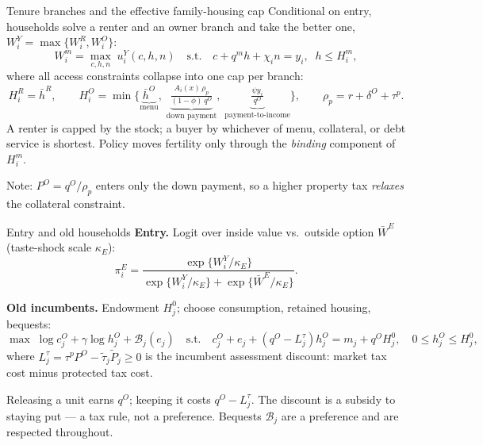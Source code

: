 \documentclass[11pt,aspectratio=169]{beamer}
\newcommand{\1}{\mathbf 1}
\begin{document}
\begin{frame}{Tenure branches and the effective family-housing cap}
\small
Conditional on entry, households solve a renter and an owner branch and take the better one, $W_i^Y=\max\{W_i^R,W_i^O\}$:
\[
W_i^m=\max_{c,h,n}\;u_i^Y(c,h,n)
\quad\text{s.t.}\quad
c+q^m h+\chi_i n=y_i,\;\; h\le H_i^m,
\]
where all access constraints collapse into one cap per branch:
\[
H_i^R=\bar h^R,
\qquad
H_i^O=\min\Big\{
\underbrace{\bar h^O}_{\text{menu}},\;
\underbrace{\tfrac{A_i(x)\,\rho_p}{(1-\phi)\,q^O}}_{\text{down payment}},\;
\underbrace{\tfrac{\psi y_i}{q^O}}_{\text{payment-to-income}}
\Big\},
\qquad
\rho_p=r+\delta^O+\tau^p .
\]
\smallskip
A renter is capped by the stock; a buyer by whichever of menu, collateral, or debt service is shortest. Policy moves fertility only through the \emph{binding} component of $H_i^m$.

\smallskip
\footnotesize Note: $P^O=q^O/\rho_p$ enters only the down payment, so a higher property tax \emph{relaxes} the collateral constraint.
\end{frame}

\begin{frame}{Entry and old households}
\small
\textbf{Entry.} Logit over inside value vs.\ outside option $\bar W^E$ (taste-shock scale $\kappa_E$):
\[
\pi_i^E=\frac{\exp\{W_i^Y/\kappa_E\}}{\exp\{W_i^Y/\kappa_E\}+\exp\{\bar W^E/\kappa_E\}} .
\]

\medskip
\textbf{Old incumbents.} Endowment $H_j^0$; choose consumption, retained housing, bequests:
\[
\max\;\log c_j^O+\gamma\log h_j^O+\mathcal B_j(e_j)
\quad\text{s.t.}\quad
c_j^O+e_j+(q^O-L_j^\tau)h_j^O=m_j+q^OH_j^0,
\quad 0\le h_j^O\le H_j^0,
\]
where $L_j^\tau=\tau^pP^O-\tilde\tau_j\tilde P_j\ge0$ is the incumbent assessment discount: market tax cost minus protected tax cost.

\medskip
Releasing a unit earns $q^O$; keeping it costs $q^O-L_j^\tau$. The discount is a \alert{subsidy to staying put} --- a tax rule, not a preference. Bequests $\mathcal B_j$ are a preference and are respected throughout.
\end{frame}
\end{document}
